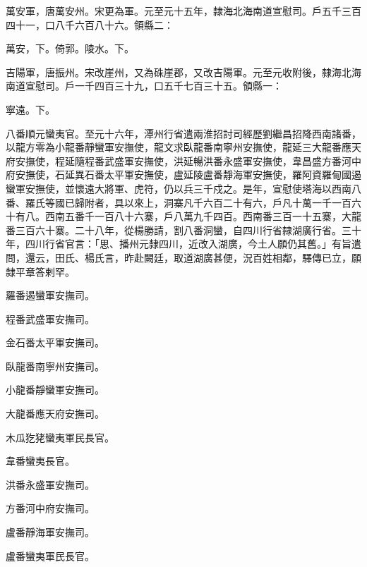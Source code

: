 \begin{pinyinscope}
 萬安軍，唐萬安州。宋更為軍。元至元十五年，隸海北海南道宣慰司。戶五千三百四十一，口八千六百八十六。領縣二：



 萬安，下。倚郭。陵水。下。



 吉陽軍，唐振州。宋改崖州，又為硃崖郡，又改吉陽軍。元至元收附後，隸海北海南道宣慰司。戶一千四百三十九，口五千七百三十五。領縣一：



 寧遠。下。



 八番順元蠻夷官。至元十六年，潭州行省遣兩淮招討司經歷劉繼昌招降西南諸番，以龍方零為小龍番靜蠻軍安撫使，龍文求臥龍番南寧州安撫使，龍延三大龍番應天府安撫使，程延隨程番武盛軍安撫使，洪延暢洪番永盛軍安撫使，韋昌盛方番河中府安撫使，石延異石番太平軍安撫使，盧延陵盧番靜海軍安撫使，羅阿資羅甸國遏蠻軍安撫使，並懷遠大將軍、虎符，仍以兵三千戍之。是年，宣慰使塔海以西南八番、羅氏等國已歸附者，具以來上，洞寨凡千六百二十有六，戶凡十萬一千一百六十有八。西南五番千一百八十六寨，戶八萬九千四百。西南番三百一十五寨，大龍番三百六十寨。二十八年，從楊勝請，割八番洞蠻，自四川行省隸湖廣行省。三十年，四川行省官言：「思、播州元隸四川，近改入湖廣，今土人願仍其舊。」有旨遣問，還云，田氏、楊氏言，昨赴闕廷，取道湖廣甚便，況百姓相鄰，驛傳已立，願隸平章答剌罕。



 羅番遏蠻軍安撫司。



 程番武盛軍安撫司。



 金石番太平軍安撫司。



 臥龍番南寧州安撫司。



 小龍番靜蠻軍安撫司。



 大龍番應天府安撫司。



 木瓜犵狫蠻夷軍民長官。



 韋番蠻夷長官。



 洪番永盛軍安撫司。



 方番河中府安撫司。



 盧番靜海軍安撫司。



 盧番蠻夷軍民長官。




\end{pinyinscope}
